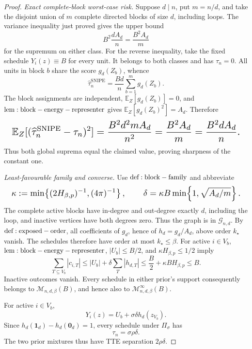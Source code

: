 \documentclass{article}
\begin{document}
\begin{proof}
\emph{Exact complete-block worst-case risk.} Suppose \(d\mid n\), put \(m=n/d\), and take the disjoint union of \(m\) complete directed blocks of size \(d\), including loops. The variance inequality just proved gives the upper bound
\[
B^2\frac{dA_d}{n}=\frac{B^2A_d}{m}
\]
for the supremum on either class. For the reverse inequality, take the fixed schedule \(Y_i(z)\equiv B\) for every unit. It belongs to both classes and has \(\tau_n=0\). All units in block \(b\) share the score \(g_d(Z_b)\), whence
\[
\widehat\tau_n^{\mathrm{SNIPE}}
=\frac{Bd}{n}\sum_{b=1}^m g_d(Z_b).
\]
The block assignments are independent, \(\mathbb E_Z[g_d(Z_b)]=0\), and \({\rm lem:block-energy-representer}\) gives \(\mathbb E_Z[g_d(Z_b)^2]=A_d\). Therefore
\[
\makebox[\linewidth][c]{\resizebox{0.98\linewidth}{!}{\(\displaystyle \mathbb E_Z[(\widehat\tau_n^{\mathrm{SNIPE}}-\tau_n)^2]
=\frac{B^2d^2mA_d}{n^2}
=\frac{B^2A_d}{m}
=\frac{B^2dA_d}{n}.\)}}
\]
Thus both global suprema equal the claimed value, proving sharpness of the constant one.

\emph{Least-favourable family and converse.} Use \({\rm def:block-family}\) and abbreviate
\[
\makebox[\linewidth][c]{\resizebox{0.98\linewidth}{!}{\(\displaystyle \kappa:=\min\!\left\{(2H_{\beta,p})^{-1},(4\pi)^{-1}\right\},
\qquad
\delta=\kappa B\min\!\left\{1,\sqrt{A_d/m}\right\}.\)}}
\]
The complete active blocks have in-degree and out-degree exactly \(d\), including the loop, and inactive vertices have both degrees zero. Thus the graph is in \(\mathcal G_{n,d}\). By \({\rm def:exposed-order}\), all coefficients of \(g_d\), hence of \(h_d=g_d/A_d\), above order \(k_\star\) vanish. The schedules therefore have order at most \(k_\star\le\beta\). For active \(i\in V_b\), \({\rm lem:block-energy-representer}\), \(|U_b|\le B/2\), and \(\kappa H_{\beta,p}\le1/2\) imply
\[
\sum_{T\subseteq V_b}|c_{i,T}|
\le |U_b|+\delta\sum_T|h_{d,T}|
\le\frac B2+\kappa BH_{\beta,p}
\le B.
\]
Inactive outcomes vanish. Every schedule in either prior's support consequently belongs to \(\mathcal M_{n,d,\beta}(B)\), and hence also to \(\mathcal M_{n,d,\beta}^{\infty}(B)\).

For active \(i\in V_b\),
\[
Y_i(z)=U_b+\sigma\delta h_d(z_{V_b}).
\]
Since \(h_d(\mathbf1_d)-h_d(\mathbf0_d)=1\), every schedule under \(\Pi_\sigma\) has
\[
\tau_n=\sigma\rho\delta.
\]
The two prior mixtures thus have TTE separation \(2\rho\delta\).


\end{proof}
\end{document}
